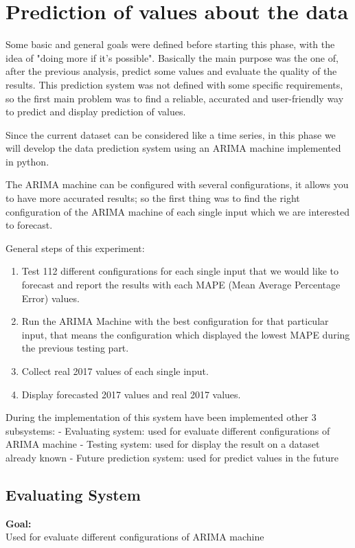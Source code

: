 \section{Prediction of values about the data}

Some basic and general goals were defined before starting this phase, with the idea of "doing more if it's possible". Basically the main purpose was the one of, after the previous analysis, predict some values and evaluate the quality of the results.
This prediction system was not defined with some specific requirements, so the first main problem was to find a reliable, accurated and user-friendly way to predict and display prediction of values.

Since the current dataset can be considered like a time series, in this phase we will develop the data prediction system using an ARIMA machine implemented in python.

The ARIMA machine can be configured with several configurations, it allows you to have more accurated results; so the first thing was to find the right configuration of the ARIMA machine of each single input which we are interested to forecast.

General steps of this experiment:
\begin{enumerate}
\item Test 112 different configurations for each single input that we would like to forecast and report the results with each MAPE (Mean Average Percentage Error) values.
\item Run the ARIMA Machine with the best configuration for that particular input, that means the configuration which displayed the lowest MAPE during the previous testing part.
\item Collect real 2017 values of each single input.
\item Display forecasted 2017 values and real 2017 values.
\end{enumerate}

During the implementation of this system have been implemented other 3 subsystems:
- Evaluating system: used for evaluate different configurations of ARIMA machine
- Testing system: used for display the result on a dataset already known
- Future prediction system: used for predict values in the future
	
\newpage
\subsection{Evaluating System}
\textbf{Goal:}\\ Used for evaluate different configurations of ARIMA machine

